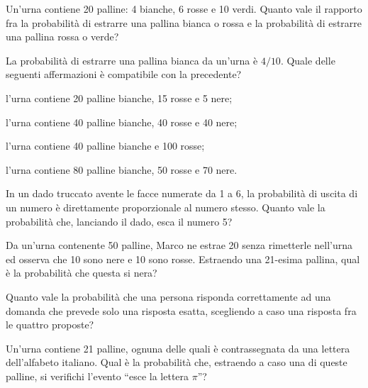 \begin{esercizio} %
Un'urna contiene 20 palline: 4 bianche, 6 rosse e 10 verdi. Quanto vale il rapporto fra la probabilità di estrarre una pallina bianca o rossa e la probabilità di estrarre una pallina rossa o verde?
\end{esercizio}

\begin{esercizio} %
La probabilità di estrarre una pallina bianca da un'urna è $4/10$. Quale delle seguenti affermazioni è compatibile con la precedente?
\begin{itemize*}
\item l'urna contiene 20 palline bianche, 15 rosse e 5 nere;
\item l'urna contiene 40 palline bianche, 40 rosse e 40 nere;
\item l'urna contiene 40 palline bianche e 100 rosse;
\item l'urna contiene 80 palline bianche, 50 rosse e 70 nere.
\end{itemize*}
\end{esercizio}

\begin{esercizio} %
In un dado truccato avente le facce numerate da 1 a 6, la probabilità di uscita di un numero è direttamente proporzionale al numero stesso. Quanto vale la probabilità che, lanciando il dado, esca il numero 5?
\end{esercizio}

\begin{esercizio} %
Da un'urna contenente 50 palline, Marco ne estrae 20 senza rimetterle nell'urna ed osserva che 10 sono nere e 10 sono rosse. Estraendo una 21-esima pallina, qual è la probabilità che questa si nera?
\end{esercizio}

\begin{esercizio} %
Quanto vale la probabilità che una persona risponda correttamente ad una domanda che prevede solo una risposta esatta, scegliendo a caso una risposta fra le quattro proposte?
\end{esercizio}

\begin{esercizio} %
Un'urna contiene 21 palline, ognuna delle quali è contrassegnata da una lettera dell'alfabeto italiano. Qual è la probabilità che, estraendo a caso una di queste palline, si verifichi l'evento ``esce la lettera $\pi $''?
\end{esercizio}

